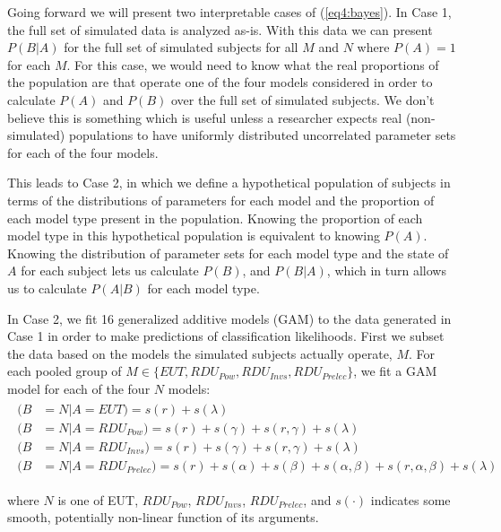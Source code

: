 \documentclass[../main.tex]{subfiles}
\begin{document}
Going forward we will present two interpretable cases of (\ref{eq4:bayes}).
In Case 1, the full set of simulated data is analyzed as-is.
With this data we can present $P(B|A)$ for the full set of simulated subjects for all $M$ and $N$ where $P(A) = 1$ for each $M$.
For this case, we would need to know what the real proportions of the population are that operate one of the four models considered in order to calculate $P(A)$ and $P(B)$ over the full set of simulated subjects.
We don't believe this is something which is useful unless a researcher expects real (non-simulated) populations to have uniformly distributed uncorrelated parameter sets for each of the four models.

This leads to Case 2, in which we define a hypothetical population of subjects in terms of the distributions of parameters for each model and the proportion of each model type present in the population.
Knowing the proportion of each model type in this hypothetical population is equivalent to knowing $P(A)$.
Knowing the distribution of parameter sets for each model type and the state of $A$ for each subject lets us calculate $P(B)$, and $P(B|A)$, which in turn allows us to calculate $P(A|B)$ for each model type.

In Case 2, we fit 16 generalized additive models (GAM) \parencite{Hastie1986} to the data generated in Case 1 in order to make predictions of classification likelihoods.
First we subset the data based on the models the simulated subjects actually operate, $M$.
For each pooled group of $M \in \lbrace \textit{EUT}, \mathit{RDU_{Pow}}, \mathit{RDU_{Invs}}, \mathit{RDU_{Prelec}} \rbrace$, we fit a GAM model for each of the four $N$ models:
\begin{align}
	\label{eq4:GAM}
	\begin{split}
		(B &= N | A = EUT)                   = s(r) + s(\lambda)\\
		(B &= N | A = \mathit{RDU_{Pow}})    = s(r) + s(\gamma) + s(r, \gamma) + s(\lambda)\\
		(B &= N | A = \mathit{RDU_{Invs}})   = s(r) + s(\gamma) + s(r, \gamma) + s(\lambda)\\
		(B &= N | A = \mathit{RDU_{Prelec}}) = s(r) + s(\alpha) + s(\beta) +s(\alpha, \beta) + s(r, \alpha, \beta) + s(\lambda)
	\end{split}
\end{align}

\noindent where $N$ is one of EUT, $\mathit{RDU_{Pow}}$, $\mathit{RDU_{Invs}}$, $\mathit{RDU_{Prelec}}$, and $s(\cdot)$ indicates some smooth, potentially non-linear function of its arguments.
\end{document}
